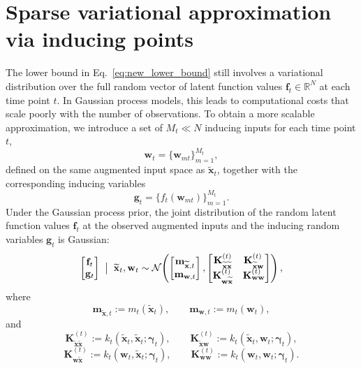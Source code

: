 \section{Sparse variational approximation via inducing points}

The lower bound in Eq.~\eqref{eq:new_lower_bound} still involves a variational
distribution over the full random vector of latent function values
\(\mathbf{f}_t \in \mathbb{R}^N\) at each time point \(t\). 
In Gaussian process models, this leads to computational costs
that scale poorly with the number of observations. 
To obtain a more scalable approximation, we introduce a set of 
\(M_t \ll N\) inducing inputs for each time point \(t\), 
\[ \mathbf{w}_t = \{\mathbf{w}_{mt}\}_{m=1}^{M_t}, \] 
defined on the same augmented input space as \(\widetilde{\mathbf{x}}_t\), 
together with the corresponding inducing variables 
\[ 
\mathbf{g}_t = \{f_t(\mathbf{w}_{mt})\}_{m=1}^{M_t}. 
\]
Under the Gaussian process prior, the joint distribution of the random latent
function values \(\mathbf{f}_t\) at the observed augmented inputs and the
inducing random variables \(\mathbf{g}_t\) is Gaussian:
\[
\begin{bmatrix}
\mathbf{f}_t\\
\mathbf{g}_t
\end{bmatrix}
\;\bigm|\;
\widetilde{\mathbf{x}}_t,\mathbf{w}_t
\sim
\mathcal{N}\!\left(
\begin{bmatrix}
\mathbf{m}_{\widetilde{\mathbf{x}},t}\\
\mathbf{m}_{\mathbf{w},t}
\end{bmatrix},
\begin{bmatrix}
\mathbf{K}^{(t)}_{\widetilde{\mathbf{x}}\widetilde{\mathbf{x}}} & \mathbf{K}^{(t)}_{\widetilde{\mathbf{x}}\mathbf{w}}\\
\mathbf{K}^{(t)}_{\mathbf{w}\widetilde{\mathbf{x}}} & \mathbf{K}^{(t)}_{\mathbf{w}\mathbf{w}}
\end{bmatrix}
\right),
\]
where
\[
\mathbf{m}_{\widetilde{\mathbf{x}},t} := m_t(\widetilde{\mathbf{x}}_t),
\qquad
\mathbf{m}_{\mathbf{w},t} := m_t(\mathbf{w}_t),
\]
and
\[
\mathbf{K}^{(t)}_{\widetilde{\mathbf{x}}\widetilde{\mathbf{x}}} := k_t(\widetilde{\mathbf{x}}_t,\widetilde{\mathbf{x}}_t;\boldsymbol{\gamma}_t),
\qquad
\mathbf{K}^{(t)}_{\widetilde{\mathbf{x}}\mathbf{w}} := k_t(\widetilde{\mathbf{x}}_t,\mathbf{w}_t;\boldsymbol{\gamma}_t),
\]
\[
\mathbf{K}^{(t)}_{\mathbf{w}\widetilde{\mathbf{x}}} := k_t(\mathbf{w}_t,\widetilde{\mathbf{x}}_t;\boldsymbol{\gamma}_t),
\qquad
\mathbf{K}^{(t)}_{\mathbf{w}\mathbf{w}} := k_t(\mathbf{w}_t,\mathbf{w}_t;\boldsymbol{\gamma}_t).
\]
